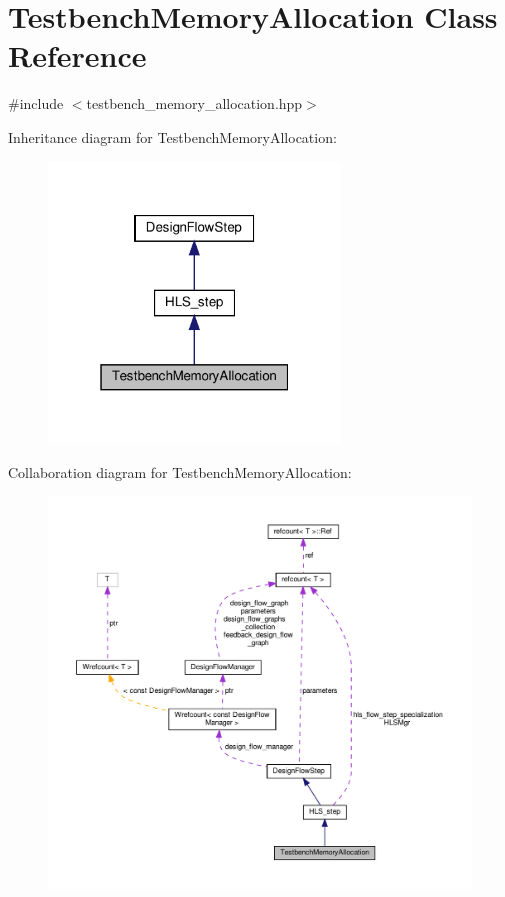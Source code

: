 \hypertarget{classTestbenchMemoryAllocation}{}\section{Testbench\+Memory\+Allocation Class Reference}
\label{classTestbenchMemoryAllocation}


{\ttfamily \#include $<$testbench\+\_\+memory\+\_\+allocation.\+hpp$>$}



Inheritance diagram for Testbench\+Memory\+Allocation\+:
\nopagebreak
\begin{figure}[H]
\begin{center}
\leavevmode
\includegraphics[width=220pt]{d9/d2e/classTestbenchMemoryAllocation__inherit__graph}
\end{center}
\end{figure}


Collaboration diagram for Testbench\+Memory\+Allocation\+:
\nopagebreak
\begin{figure}[H]
\begin{center}
\leavevmode
\includegraphics[width=350pt]{d3/d74/classTestbenchMemoryAllocation__coll__graph}
\end{center}
\end{figure}
